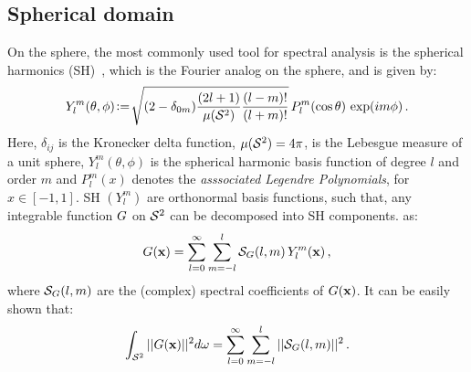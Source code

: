 %
%
%
\subsection{Spherical domain}
On the sphere, the most commonly used tool for spectral analysis is the spherical harmonics
(SH)~\cite{Groemer1996}, which is the Fourier analog on the sphere, and is given by:
%
\begin{equation}
\label{eq:SH}
Y_l^m(\theta,\phi) \!\mathrel{\mathop:}=\! {\sqrt{(2-\delta_{0m})\frac{(2l+1)}{{\mu({\mathcal{S}^{2}})}}\frac{(l-m)!}{(l+m)!}}} \, P_l^m(\cos\theta) \, \exp({im\phi})\,.
\end{equation}
%
Here, $\delta_{ij}$ is the Kronecker delta function, ${\mu({\mathcal{S}^{2}})}=4\pi$, is the Lebesgue measure of a unit 
sphere, $Y_l^m(\theta,\phi)$ is the spherical harmonic basis
function of degree $l$ and order $m$ and $P_l^m(x)$ denotes  the \emph{asssociated Legendre
Polynomials}, for $x \in [-1,1]$. SH $(Y_l^m)$ are orthonormal basis functions, such that,  any integrable function
${G}$ on ${\mathcal{S}^{2}}$ can be decomposed into SH components.
 as:
\begin{align}
\label{eq:SHDecomposition}
{G}(\mathbf{x}) = \sum_{l=0}^{\infty} \sum_{m=-l}^{l}  \mathcal{S}_{{G}}(l,m) \, Y_l^m(\mathbf{x})\,,
\end{align}
%
where $\mathcal{S}_{{G}}(l,m)$ are the (complex) spectral coefficients of ${G}(\mathbf{x})$. 
It can be easily shown that:
%
\begin{equation}
\int_{{\mathcal{S}^{2}}} ||{G}(\mathbf{x})||^2 d\omega = \sum_{l=0}^{\infty} \sum_{m=-l}^{l} ||\mathcal{S}_{{G}}(l,m)||^2\,.
\end{equation}


